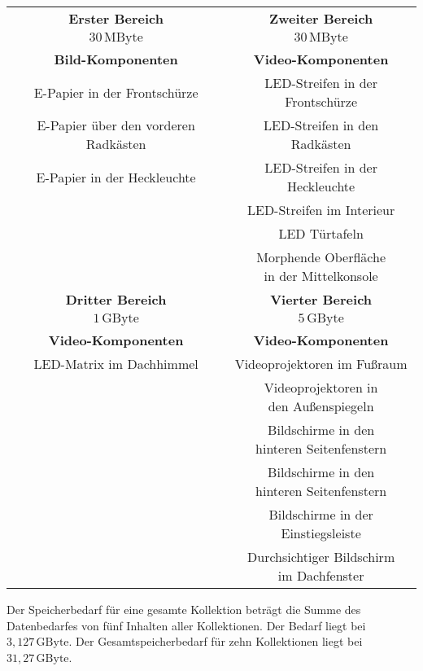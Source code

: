 \begin{table}[hbt]	
	\centering
	\renewcommand{\arraystretch}{1.5}	%
	\label{tab:Einteilung2}
	\begin{tabular}{c|c}
		\hline
		\textbf{Erster Bereich} & \textbf{Zweiter Bereich} \\
		$ 30\,\mathrm{MByte} $ & $ 30\,\mathrm{MByte} $ \\
		\hline
		\textbf{Bild-Komponenten} & \textbf{Video-Komponenten} \\
		\hline
		\hline
		\parbox[t]{0.3\linewidth}{\centering E-Papier in der Frontschürze} & \parbox[t]{0.3\linewidth}{\centering LED-Streifen in der Frontschürze}  \\
		\parbox[t]{0.3\linewidth}{\centering E-Papier über den vorderen Radkästen} & \parbox[t]{0.3\linewidth}{\centering LED-Streifen in den Radkästen} \\
		\parbox[t]{0.3\linewidth}{\centering E-Papier in der Heckleuchte} & \parbox[t]{0.3\linewidth}{\centering LED-Streifen in der Heckleuchte} \\
		& \parbox[t]{0.3\linewidth}{\centering LED-Streifen im Interieur} \\
		& \parbox[t]{0.3\linewidth}{\centering LED Türtafeln} \\
		& \parbox[t]{0.3\linewidth}{\centering Morphende Oberfläche\\in der Mittelkonsole} \\
		\hline
		\textbf{Dritter Bereich} & \textbf{Vierter Bereich} \\
		$ 1\,\mathrm{GByte} $ & $ 5\,\mathrm{GByte} $ \\
		\hline
		\textbf{Video-Komponenten} & \textbf{Video-Komponenten} \\
		\hline
		\hline
		\parbox[t]{0.3\linewidth}{\centering LED-Matrix im Dachhimmel} & \parbox[t]{0.3\linewidth}{\centering Videoprojektoren im Fußraum} \\
		& \parbox[t]{0.3\linewidth}{\centering Videoprojektoren in\\den Außenspiegeln} \\ 
		& \parbox[t]{0.3\linewidth}{\centering Bildschirme in den\\hinteren Seitenfenstern} \\ 
		& \parbox[t]{0.3\linewidth}{\centering Bildschirme in den\\hinteren Seitenfenstern} \\
		& \parbox[t]{0.3\linewidth}{\centering  Bildschirme in der Einstiegsleiste} \\
		& \parbox[t]{0.3\linewidth}{\centering Durchsichtiger Bildschirm\\im Dachfenster} \\
	\end{tabular} 
\end{table}
Der Speicherbedarf für eine gesamte Kollektion beträgt die Summe des Datenbedarfes von fünf Inhalten aller Kollektionen. Der Bedarf liegt bei $ 3,127\,\mathrm{GByte} $. Der Gesamtspeicherbedarf für zehn Kollektionen liegt bei $ 31,27\,\mathrm{GByte} $.
